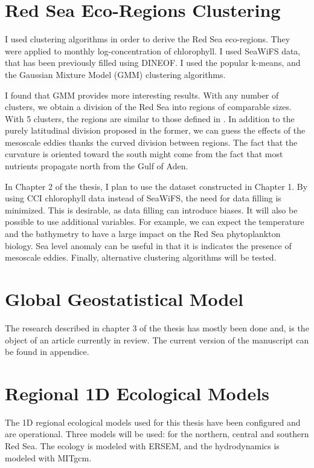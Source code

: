 \section{Red Sea Eco-Regions Clustering}

I used clustering algorithms in order to derive the Red Sea eco-regions. They
were applied to monthly log-concentration of chlorophyll. I used SeaWiFS data,
that has been previously filled using DINEOF. I used the popular k-means, and
the Gaussian Mixture Model (GMM) clustering algorithms.

I found that GMM provides more interesting results. With any number of
clusters, we obtain a division of the Red Sea into regions of comparable sizes.
With 5 clusters, the regions are similar to those defined in
\citet{Raitsos2013}. In addition to the purely latitudinal division proposed in
the former, we can guess the effects of the mesoscale eddies thanks the curved
division between regions. The fact that the curvature is oriented toward the
south might come from the fact that most nutrients propagate north from the
Gulf of Aden.

In Chapter 2 of the thesis, I plan to use the dataset constructed in Chapter 1.
By using CCI chlorophyll data instead of SeaWiFS, the need for data filling is
minimized. This is desirable, as data filling can introduce biases. It will
also be possible to use additional variables. For example, we can expect the
temperature and the bathymetry to have a large impact on the Red Sea
phytoplankton biology. Sea level anomaly can be useful in that it is indicates
the presence of mesoscale eddies. Finally, alternative clustering algorithms
will be tested.

\section{Global Geostatistical Model}

The research described in chapter 3 of the thesis has mostly been done and, is
the object of an article currently in review. The current version of the
manuscript can be found in appendice.

\section{Regional 1D Ecological Models}

The 1D regional ecological models used for this thesis have been configured
and are operational. Three models will be used: for the northern, central and 
southern Red Sea. The ecology is modeled with ERSEM, and the hydrodynamics
is modeled with MITgcm.


